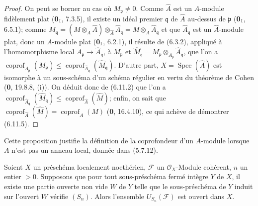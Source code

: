 \begin{proof}
On peut se borner au cas où $M_{\mathfrak p}\ne0$. Comme $\widehat A$ est
un $A$-module fidèlement plat (\textbf{0}$_{\rm I}$, 7.3.5), il existe un idéal
premier $\mathfrak q$ de $\widehat A$ au-dessus de $\mathfrak p$
(\textbf{0}$_{\rm I}$, 6.5.1); comme
$\widehat M_{\mathfrak q}=(M\otimes_A\widehat A)\otimes_{\widehat A}\widehat A_{\mathfrak q}
=M\otimes_A\widehat A_{\mathfrak q}$ et que
$\widehat A_{\mathfrak q}$ est un $\widehat A$-module plat, donc un
$A$-module plat (\textbf{0}$_{\rm I}$, 6.2.1), il résulte de (6.3.2),
appliqué à l'homomorphisme local
$A_{\mathfrak p}\to\widehat A_{\mathfrak q}$, à $M_{\mathfrak p}$ et
$\widehat M_{\mathfrak q}=M_{\mathfrak p}\otimes_{A_{\mathfrak p}}\widehat A_{\mathfrak q}$, que l'on a
$\operatorname{coprof}_{A_{\mathfrak p}}(M_{\mathfrak p})\leq
\operatorname{coprof}_{\widehat A_{\mathfrak q}}
(\widehat M_{\mathfrak q})$. D'autre part,
$X=\operatorname{Spec}(\widehat A)$ est isomorphe à un sous-schéma d'un
schéma régulier en vertu du théorème de Cohen (\textbf{0}, 19.8.8, (i)). On déduit
donc de (6.11.2) que l'on a
$\operatorname{coprof}_{\widehat A_{\mathfrak q}}
(\widehat M_{\mathfrak q})\leq
\operatorname{coprof}_{\widehat A}(\widehat M)$; enfin, on sait que
$\operatorname{coprof}_{\widehat A}(\widehat M)=
\operatorname{coprof}_A(M)$ (\textbf{0}, 16.4.10), ce qui achève de démontrer
(6.11.5).
\end{proof}

Cette proposition justifie la définition de la coprofondeur d'un
$A$-module lorsque $A$ n'est pas un anneau local, donnée dans (5.7.12).

\begin{proposition}[6.11.6]
\label{IV.2.s6.11.6-fr}
Soient $X$ un préschéma localement noethérien, $\mathcal F$ un
$\mathcal O_X$-Module cohérent, $n$ un entier $>0$. Supposons que pour tout
sous-préschéma fermé intègre $Y$ de $X$, il existe une partie ouverte non
vide $W$ de $Y$ telle que le sous-préschéma de $Y$ induit sur l'ouvert $W$
vérifie $(S_n)$. Alors l'ensemble $U_{S_n}(\mathcal F)$ est ouvert dans
$X$.
\end{proposition}


